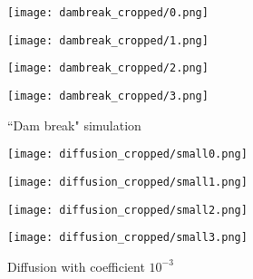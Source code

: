 \begin{figure}[H]
    \centering
    
    \begin{minipage}[t]{.24\linewidth}
        \centering
        \vspace{0pt}
        \texttt{[image: dambreak\_cropped/0.png]}
    \end{minipage}
    \begin{minipage}[t]{.24\linewidth}
        \centering
        \vspace{0pt}
        \texttt{[image: dambreak\_cropped/1.png]}
    \end{minipage}
    \begin{minipage}[t]{.24\linewidth}
        \centering
        \vspace{0pt}
        \texttt{[image: dambreak\_cropped/2.png]}
    \end{minipage}
    \begin{minipage}[t]{.24\linewidth}
        \centering
        \vspace{0pt}
        \texttt{[image: dambreak\_cropped/3.png]}
    \end{minipage}

    \caption{``Dam break" simulation}
    \label{fig dambreak}
\end{figure}

\begin{figure}[H]
    \centering
    
    \begin{minipage}[t]{.24\linewidth}
        \centering
        \vspace{0pt}
        \texttt{[image: diffusion\_cropped/small0.png]}
    \end{minipage}
    \begin{minipage}[t]{.24\linewidth}
        \centering
        \vspace{0pt}
        \texttt{[image: diffusion\_cropped/small1.png]}
    \end{minipage}
    \begin{minipage}[t]{.24\linewidth}
        \centering
        \vspace{0pt}
        \texttt{[image: diffusion\_cropped/small2.png]}
    \end{minipage}
    \begin{minipage}[t]{.24\linewidth}
        \centering
        \vspace{0pt}
        \texttt{[image: diffusion\_cropped/small3.png]}
    \end{minipage}

    \caption{Diffusion with coefficient $10^{-3}$}
    \label{fig diffusion 1e-3}
\end{figure}



